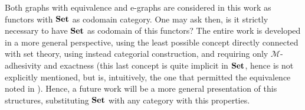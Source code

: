 Both graphs with equivalence and e-graphs are considered in this work as functors with $\mathbf{Set}$ as codomain category.
One may ask then, is it strictly necessary to have $\mathbf{Set}$ as codomain of this functors?
The entire work is developed in a more general perspective, using the least possible concept directly connected with set theory, using instead categorial construction, and requiring only $\mathcal{M}$-adhesivity and exactness (this last concept is quite implicit in $\mathbf{Set}$, hence is not explicitly mentioned, but is, intuitively, the one that permitted the equivalence noted in ).
Hence, a future work will be a more general presentation of this structures, substituting $\mathbf{Set}$ with any category with this properties.
